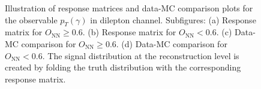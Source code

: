 \begin{figure}[ht]
    \centering
    \quad\quad
    \quad\quad
    \quad\quad
    \quad\quad
    \caption{Illustration of response matrices and data-MC comparison plots for the observable $p_T(\gamma)$ in dilepton channel. Subfigures: (a) Response matrix for $O_{\mathrm{NN}} \geq 0.6$. (b) Response matrix for $O_{\mathrm{NN}} < 0.6$. (c) Data-MC comparison for $O_{\mathrm{NN}} \geq 0.6$. (d) Data-MC comparison for $O_{\mathrm{NN}} < 0.6$. The signal distribution at the reconstruction level is created by folding the truth distribution with the corresponding response matrix.}
    \label{fig:folding_input_response_dilep}
\end{figure}
\FloatBarrier








